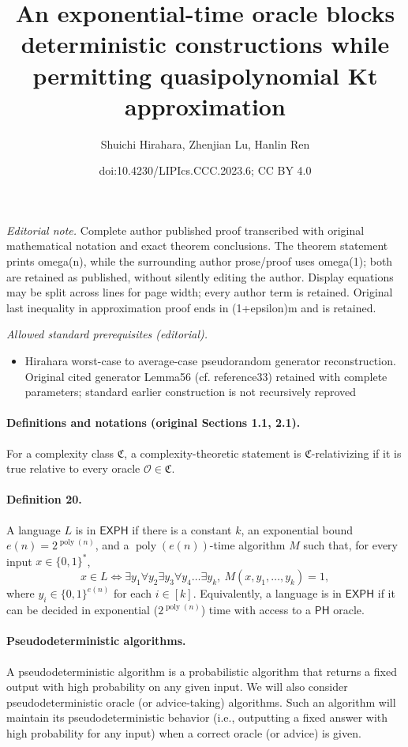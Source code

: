 \documentclass[10pt,a4paper]{article}
\title{An exponential-time oracle blocks deterministic constructions while permitting quasipolynomial Kt approximation}
\author{Shuichi Hirahara, Zhenjian Lu, Hanlin Ren}
\date{doi:10.4230/LIPIcs.CCC.2023.6; CC BY 4.0}
\begin{document}
\maketitle
\noindent\textit{Editorial note.} Complete author published proof transcribed with original mathematical notation and exact theorem conclusions. The theorem statement prints omega(n), while the surrounding author prose/proof uses omega(1); both are retained as published, without silently editing the author. Display equations may be split across lines for page width; every author term is retained. Original last inequality in approximation proof ends in (1+epsilon)m and is retained.\par\medskip
\noindent\textit{Allowed standard prerequisites (editorial).}\begin{itemize}
\item Hirahara worst-case to average-case pseudorandom generator reconstruction. Original cited generator Lemma56 (cf. reference33) retained with complete parameters; standard earlier construction is not recursively reproved
\end{itemize}\medskip
\paragraph{Definitions and notations (original Sections 1.1, 2.1).}
For a complexity class $\mathfrak C$, a complexity-theoretic statement is $\mathfrak C$-relativizing if it is true relative to every oracle $\mathcal O\in\mathfrak C$.
\paragraph{Definition 20.} A language $L$ is in $\mathsf{EXPH}$ if there is a constant $k$, an exponential bound $e(n)=2^{\operatorname{poly}(n)}$, and a $\operatorname{poly}(e(n))$-time algorithm $M$ such that, for every input $x\in\{0,1\}^*$,
\[x\in L\Longleftrightarrow\exists y_1\forall y_2\exists y_3\forall y_4\ldots\exists y_k,\ M(x,y_1,\ldots,y_k)=1,\]
where $y_i\in\{0,1\}^{e(n)}$ for each $i\in[k]$. Equivalently, a language is in $\mathsf{EXPH}$ if it can be decided in exponential ($2^{\operatorname{poly}(n)}$) time with access to a $\mathsf{PH}$ oracle.
\paragraph{Pseudodeterministic algorithms.} A pseudodeterministic algorithm is a probabilistic algorithm that returns a fixed output with high probability on any given input. We will also consider pseudodeterministic oracle (or advice-taking) algorithms. Such an algorithm will maintain its pseudodeterministic behavior (i.e., outputting a fixed answer with high probability for any input) when a correct oracle (or advice) is given.
\end{document}
